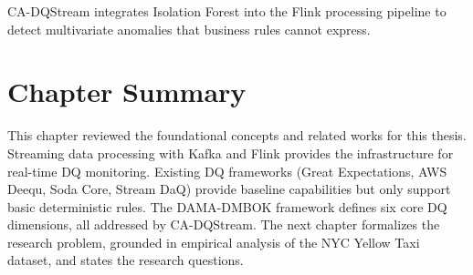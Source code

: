 CA-DQStream integrates Isolation Forest into the Flink processing pipeline to detect multivariate anomalies that business rules cannot express.

\section{Chapter Summary}

This chapter reviewed the foundational concepts and related works for this thesis. Streaming data processing with Kafka and Flink provides the infrastructure for real-time DQ monitoring. Existing DQ frameworks (Great Expectations, AWS Deequ, Soda Core, Stream DaQ) provide baseline capabilities but only support basic deterministic rules. The DAMA-DMBOK framework defines six core DQ dimensions, all addressed by CA-DQStream. The next chapter formalizes the research problem, grounded in empirical analysis of the NYC Yellow Taxi dataset, and states the research questions.
